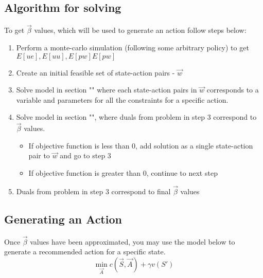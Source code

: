 \documentclass{article}
\begin{document}
\subsection{Algorithm for solving}
To get $\vec{\beta}$ values, which will be used to generate an action follow steps below:
\begin{enumerate}
	\item Perform a monte-carlo simulation (following some arbitrary policy) to get $E[ue], E[uu], E[pw] E[pw]$
	\item Create an initial feasible set of state-action pairs - $\vec{w}$
	\item Solve model in section "" where each state-action pairs in $\vec{w}$ corresponds to a variable and parameters for all the constraints for a specific action.
	\item Solve model in section "", where duals from problem in step 3  correspond to $\vec{\beta}$ values. 
		\begin{itemize}
			\item If objective function is less than 0, add solution as a single state-action pair to $\vec{w}$ and go to step 3
			\item If objective function is greater than 0, continue to next step
		\end{itemize}
	\item Duals from problem in step 3 correspond to final $\vec{\beta}$ values
\end{enumerate}
	
\subsection{Generating an Action}
Once $\vec{\beta}$ values have been approximated, you may use the model below to generate a recommended action for a specific state.
\begin{equation*}
	\min_{\vec{A}} c(\vec{S}, \vec{A}) + \gamma v(S')
\end{equation*}	
\end{document}
